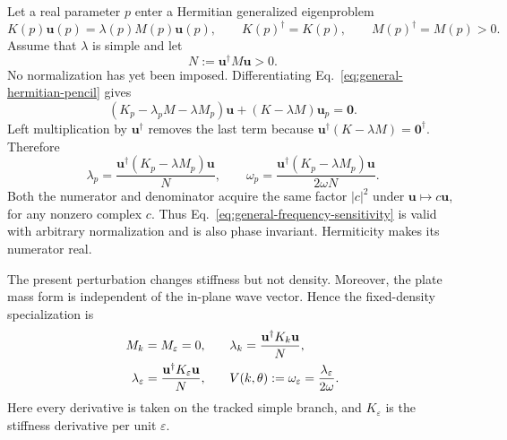 Let a real parameter \(p\) enter a Hermitian generalized eigenproblem
\begin{equation}
  K(p)\mathbf u(p)=\lambda(p)M(p)\mathbf u(p),
  \qquad
  K(p)^\dagger=K(p),
  \qquad
  M(p)^\dagger=M(p)>0.
  \label{eq:general-hermitian-pencil}
\end{equation}
Assume that \(\lambda\) is simple and let
\begin{equation}
  N:=\mathbf u^\dagger M\mathbf u>0.
  \label{eq:arbitrary-mass-norm}
\end{equation}
No normalization has yet been imposed.  Differentiating
Eq.~\eqref{eq:general-hermitian-pencil} gives
\begin{equation}
  (K_p-\lambda_pM-\lambda M_p)\mathbf u
  +(K-\lambda M)\mathbf u_p=\mathbf0.
  \label{eq:differentiated-general-pencil}
\end{equation}
Left multiplication by \(\mathbf u^\dagger\) removes the last term because
\(\mathbf u^\dagger(K-\lambda M)=\mathbf0^\dagger\).  Therefore
\begin{equation}
  \lambda_p
  =\frac{\mathbf u^\dagger(K_p-\lambda M_p)\mathbf u}{N},
  \qquad
  \omega_p
  =\frac{\mathbf u^\dagger(K_p-\lambda M_p)\mathbf u}
         {2\omega N}.
  \label{eq:general-frequency-sensitivity}
\end{equation}
Both the numerator and denominator acquire the same factor \(|c|^2\) under
\(\mathbf u\mapsto c\mathbf u\), for any nonzero complex \(c\).  Thus
Eq.~\eqref{eq:general-frequency-sensitivity} is valid with arbitrary
normalization and is also phase invariant.  Hermiticity makes its numerator
real.

The present perturbation changes stiffness but not density.  Moreover, the
plate mass form is independent of the in-plane wave vector.  Hence the
fixed-density specialization is
\begin{align}
  M_k=M_\varepsilon=0,
  \qquad&
  \lambda_k=\frac{\mathbf u^\dagger K_k\mathbf u}{N},
  \notag\\
  \lambda_\varepsilon
  =\frac{\mathbf u^\dagger K_\varepsilon\mathbf u}{N},
  \qquad&
  V(k,\theta):=\omega_\varepsilon
  =\frac{\lambda_\varepsilon}{2\omega}.
  \label{eq:fixed-mass-first-sensitivities}
\end{align}
Here every derivative is taken on the tracked simple branch, and
\(K_\varepsilon\) is the stiffness derivative per unit \(\varepsilon\).

